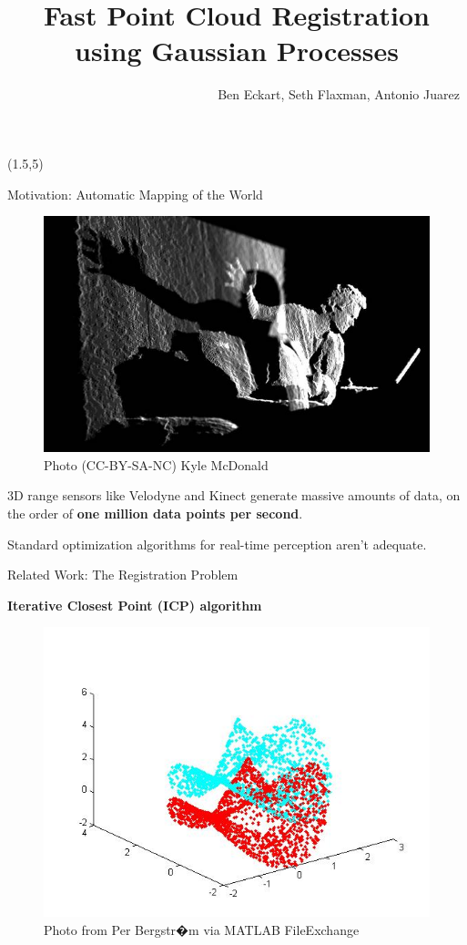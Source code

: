 \documentclass[final]{beamer}
\title{Fast Point Cloud Registration using Gaussian Processes}
\author{~~~~~~~~~~~~~~~~~~~~~~~~~~~~~~~~Ben Eckart, Seth Flaxman, Antonio Juarez}
\date{}
\begin{document}

\begin{frame}{} 

\begin{textblock}{27}(1.5,5)
\begin{block}{Motivation: Automatic Mapping of the World}
\begin{figure}
\includegraphics[width=10in]{kyle_kinect.jpg}
\caption{Photo (CC-BY-SA-NC) Kyle McDonald}
\end{figure}

3D range sensors like Velodyne and Kinect generate massive amounts of data, on the order of
{\bf one million data points per second}.

Standard optimization algorithms for real-time perception aren't adequate.

\end{block}

\begin{block}{Related Work: The Registration Problem}

{\bf Iterative Closest Point (ICP) algorithm} 
\begin{figure}
\includegraphics[width=10in]{icpCpp.jpg}
\caption{Photo from Per Bergstr�m via MATLAB FileExchange}
\end{figure}


\end{block}
\end{textblock}
\end{frame}
\end{document}

